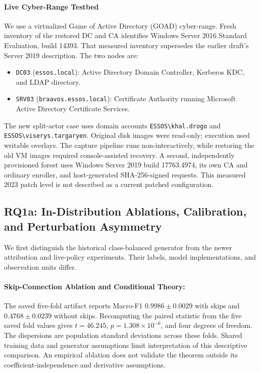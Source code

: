 \paragraph{Live Cyber-Range Testbed} We use a virtualized Game of Active Directory (GOAD) cyber-range. Fresh inventory of the restored DC and CA identifies Windows Server 2016 Standard Evaluation, build 14393. That measured inventory supersedes the earlier draft's Server 2019 description. The two nodes are:
\begin{itemize}
    \item \texttt{DC03} (\texttt{essos.local}): Active Directory Domain Controller, Kerberos KDC, and LDAP directory.
    \item \texttt{SRV03} (\texttt{braavos.essos.local}): Certificate Authority running Microsoft Active Directory Certificate Services.
\end{itemize}
The new split-actor case uses domain accounts \texttt{ESSOS\textbackslash khal.drogo} and \texttt{ESSOS\textbackslash viserys.targaryen}. Original disk images were read-only; execution used writable overlays. The capture pipeline runs non-interactively, while restoring the old VM images required console-assisted recovery. A second, independently provisioned forest uses Windows Server 2019 build 17763.4974, its own CA and ordinary enroller, and host-generated SHA-256-signed requests. This measured 2023 patch level is not described as a current patched configuration.

\subsection{RQ1a: In-Distribution Ablations, Calibration, and Perturbation Asymmetry}
We first distinguish the historical class-balanced generator from the newer attribution and live-policy experiments. Their labels, model implementations, and observation units differ.

\paragraph{Skip-Connection Ablation and Conditional Theory:}
The saved five-fold artifact reports Macro-F1 $0.9986 \pm 0.0029$ with skips and $0.4768 \pm 0.0239$ without skips. Recomputing the paired statistic from the five saved fold values gives $t=46.245$, $p=1.308\times10^{-6}$, and four degrees of freedom. The dispersions are population standard deviations across these folds. Shared training data and generator assumptions limit interpretation of this descriptive comparison. An empirical ablation does not validate the theorem outside its coefficient-independence and derivative assumptions.

